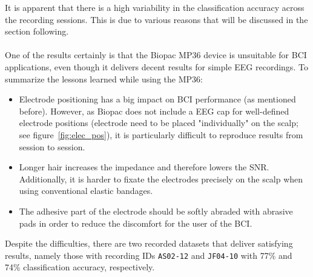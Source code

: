 \documentclass[a4paper,oneside, openright,12pt]{report}
\begin{document}
It is apparent that there is a high variability in the classification accuracy across the recording sessions. This is due to various reasons that will be discussed in the section following.\\\\
One of the results certainly is that the Biopac MP36 device is unsuitable for BCI applications, even though it delivers decent results for simple EEG recordings. To summarize the lessons learned while using the MP36:
\begin{itemize}
	\item Electrode positioning has a big impact on BCI performance (as mentioned before). However, as Biopac does not include a EEG cap for well-defined electrode positions (electrode need to be placed "individually" on the scalp; see figure~\ref{fig:elec_pos}), it is particularly difficult to reproduce results from session to session.
	\item Longer hair increases the impedance and therefore lowers the SNR. Additionally, it is harder to fixate the electrodes precisely on the scalp when using conventional elastic bandages.
	\item The adhesive part of the electrode should be softly abraded with abrasive pads in order to reduce the discomfort for the user of the BCI.
\end{itemize}
Despite the difficulties, there are two recorded datasets that deliver satisfying results, namely those with recording IDs \texttt{AS02-12} and \texttt{JF04-10} with 77\% and 74\% classification accuracy, respectively. 




\end{document}

